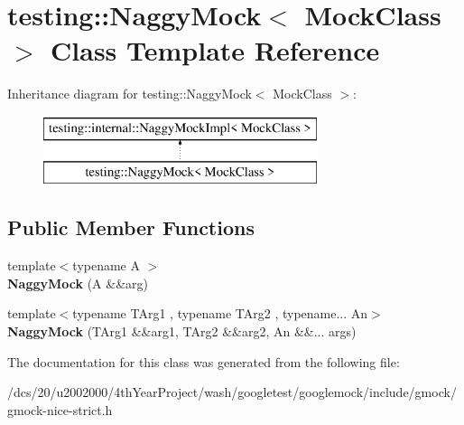 \hypertarget{classtesting_1_1NaggyMock}{}\section{testing\+:\+:Naggy\+Mock$<$ Mock\+Class $>$ Class Template Reference}
\label{classtesting_1_1NaggyMock}
Inheritance diagram for testing\+:\+:Naggy\+Mock$<$ Mock\+Class $>$\+:\begin{figure}[H]
\begin{center}
\leavevmode
\includegraphics[height=2.000000cm]{classtesting_1_1NaggyMock}
\end{center}
\end{figure}
\subsection*{Public Member Functions}
\begin{DoxyCompactItemize}
\item 
\mbox{\label{classtesting_1_1NaggyMock_aab67cd9f71451f89e5fc8938815119ea}} 
{\footnotesize template$<$typename A $>$ }\\{\bfseries Naggy\+Mock} (A \&\&arg)
\item 
\mbox{\label{classtesting_1_1NaggyMock_a54087f95264aeb62e32adf5400e91fdf}} 
{\footnotesize template$<$typename T\+Arg1 , typename T\+Arg2 , typename... An$>$ }\\{\bfseries Naggy\+Mock} (T\+Arg1 \&\&arg1, T\+Arg2 \&\&arg2, An \&\&... args)
\end{DoxyCompactItemize}


The documentation for this class was generated from the following file\+:\begin{DoxyCompactItemize}
\item 
/dcs/20/u2002000/4th\+Year\+Project/wash/googletest/googlemock/include/gmock/gmock-\/nice-\/strict.\+h\end{DoxyCompactItemize}

